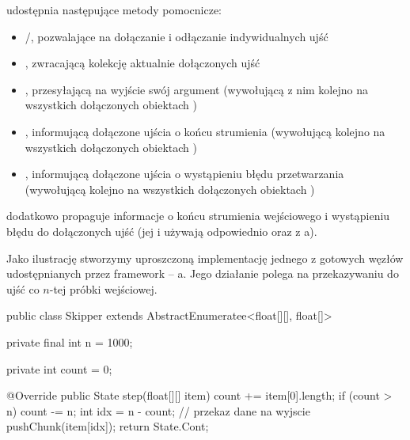  udostępnia następujące metody pomocnicze:

\begin{itemize}

  \item {}/, pozwalające na dołączanie i odłączanie indywidualnych ujść

  \item {}, zwracającą kolekcję aktualnie dołączonych ujść

  \item {}, przesyłającą na wyjście swój argument (wywołującą z nim 
    kolejno na wszystkich dołączonych obiektach )

  \item {}, informującą dołączone ujścia o końcu strumienia (wywołującą
     kolejno na wszystkich dołączonych obiektach )

  \item {}, informującą dołączone ujścia o wystąpieniu błędu przetwarzania
    (wywołującą  kolejno na wszystkich dołączonych obiektach )

\end{itemize}

 dodatkowo propaguje informacje o końcu strumienia wejściowego i
wystąpieniu błędu do dołączonych ujść (jej  i  używają odpowiednio
 oraz  z a).

Jako ilustrację stworzymy uproszczoną implementację jednego z gotowych węzłów udostępnianych przez
framework -- a. Jego działanie polega na przekazywaniu do ujść co $n$-tej próbki
wejściowej.

\begin{java}
public class Skipper extends AbstractEnumeratee<float[][], float[]> {

    private final int n = 1000;

    private int count = 0;

    @Override
    public State step(float[][] item) {
        count += item[0].length;
        if (count > n) {
            count -= n;
            int idx = n - count;
            // przekaz dane na wyjscie
            pushChunk(item[idx]);
        }
        return State.Cont;
    }
}
\end{java}

